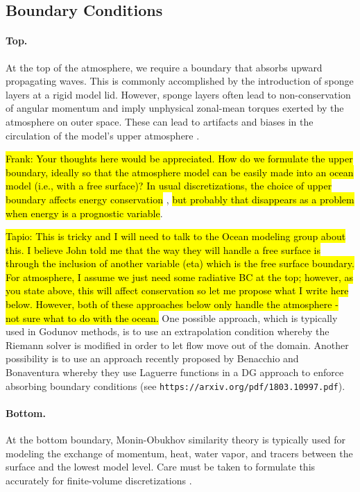 \documentclass{article}
\begin{document}
\subsection{Boundary Conditions}

\paragraph{Top.} At the top of the atmosphere, we require a boundary that absorbs upward propagating waves. This is commonly accomplished by the introduction of sponge layers at a rigid model lid. However, sponge layers often lead to non-conservation of angular momentum and imply unphysical zonal-mean torques exerted by the atmosphere on outer space. These can lead to artifacts and biases in the circulation of the model's upper atmosphere \citep[e.g.,][]{Shepherd96a}.

\hl{Frank: Your thoughts here would be appreciated. How do we formulate the upper boundary, ideally so that the atmosphere model can be easily made into an ocean model (i.e., with a free surface)? In usual discretizations, the choice of upper boundary affects energy conservation} \citep[e.g.,][]{Staniforth03a}, \hl{but probably that disappears as a problem when energy is a prognostic variable}.

\hl{Tapio: This is tricky and I will need to talk to the Ocean modeling group about this.  I believe John told me that the way they will handle a free surface is through the inclusion of another variable (eta) which is the free surface boundary. For atmosphere, I assume we just need some radiative BC at the top; however, as you state above, this will affect conservation so let me propose what I write here below. However, both of these approaches below only handle the atmosphere - not sure what to do with the ocean.}
One possible approach, which is typically used in Godunov methods, is to use an extrapolation condition whereby the Riemann solver is modified in order to let flow move out of the domain.  Another possibility is to use an approach recently proposed by Benacchio and Bonaventura whereby they use Laguerre functions in a DG approach to enforce absorbing boundary conditions (see \texttt{https://arxiv.org/pdf/1803.10997.pdf}).


\paragraph{Bottom.} At the bottom boundary, Monin-Obukhov similarity theory is typically used for modeling the exchange of momentum, heat, water vapor, and tracers between the surface and the lowest model level. Care must be taken to formulate this accurately for finite-volume discretizations  \citep{Nishizawa18a}.
\end{document}
